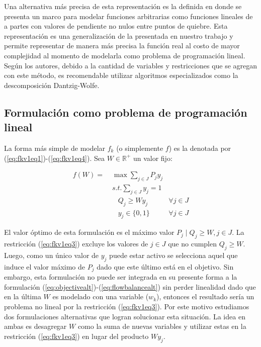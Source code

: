 Una alternativa más precisa de esta representación es la definida en \parencite{crainic2021ch8} donde se presenta un marco para modelar funciones arbitrarias como funciones lineales de a partes con valores de pendiente no nulos entre puntos de quiebre. Esta representación es una generalización de la presentada en nuestro trabajo y permite representar de manera más precisa la función real al costo de mayor complejidad al momento de modelarla como problema de programación lineal. Según los autores, debido a la cantidad de variables y restricciones que se agregan con este método, es recomendable utilizar algoritmos especializados como la descomposición Dantzig-Wolfe.

\subsection{Formulación como problema de programación lineal}

La forma más simple de modelar $f_k$ (o simplemente $f$) es la denotada por (\ref{eq:fkv1eq1})-(\ref{eq:fkv1eq4}). Sea $W \in \mathbb{R}^+$ un valor fijo:

\begin{align}
  f(W) =\; & \max \sum_{j \in J} P_j y_j    & \label{eq:fkv1eq1} \\
           & s.t. \sum_{j \in J} y_j = 1   & \label{eq:fkv1eq2} \\
           & \;\;\; Q_j \geq W y_j         & \label{eq:fkv1eq3} \forall j \in J \\
           & \;\;\; y_j \in \{0,1\}        & \label{eq:fkv1eq4} \forall j \in J
\end{align}

El valor óptimo de esta formulación es el máximo valor $P_j \;|\; Q_j \geq W, j \in J$. La restricción (\ref{eq:fkv1eq3}) excluye los valores de $j \in J$ que no cumplen $Q_j \geq W$. Luego, como un único valor de $y_j$ puede estar activo se selecciona aquel que induce el valor máximo de $P_j$ dado que este último está en el objetivo. Sin embargo, esta formulación no puede ser integrada en su presente forma a la formulación (\ref{eq:objectivealt})-(\ref{eq:flowbalancealt}) sin perder linealidad dado que en la última $W$ es modelado con una variable ($w_k$), entonces el resultado sería un problema no lineal por la restricción (\ref{eq:fkv1eq3}). Por este motivo estudiamos dos formulaciones alternativas que logran solucionar esta situación. La idea en ambas es desagregar $W$ como la suma de nuevas variables y utilizar estas en la restricción (\ref{eq:fkv1eq3}) en lugar del producto $W y_j$.

